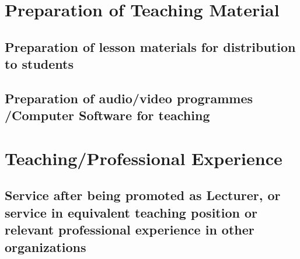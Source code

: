 \label{Workload2021}

\label{Workload2022}

\label{Workload2023}

\label{Workload2024}


\section{Preparation of Teaching Material}

\subsection{Preparation of lesson materials for distribution to students}
\label{lecture slides}

\subsection{Preparation of audio/video programmes /Computer Software for teaching}
\label{videos}








\section{Teaching/Professional Experience }


\subsection{Service after being promoted as Lecturer, or service in equivalent teaching position or relevant professional experience in other organizations }

\label{lecturer appointment}

\label{Senior lecturer appointment}


